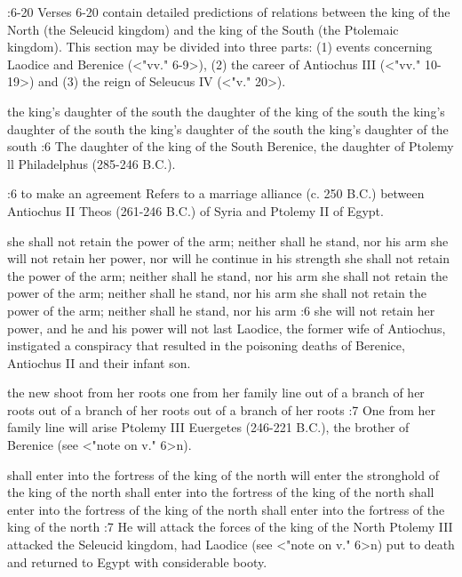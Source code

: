 :6-20 {}  Verses 6-20 contain detailed predictions of relations between the king of the North (the Seleucid kingdom) and the king 
of the South (the Ptolemaic kingdom). This section may be divided into three parts: (1) events concerning Laodice and Berenice (<"vv." 6-9>), (2) the career of Antiochus III (<"vv." 10-19>) and (3) the reign of Seleucus IV (<"v." 20>).

    {the king's daughter of the south} %
    {the daughter of the king of the south} %
    {the king's daughter of the south} %
    {the king's daughter of the south} %
    {the king's daughter of the south} %
:6 {The daughter of the king of the South} Berenice, the  
daughter of Ptolemy ll Philadelphus (285-246 B.C.).

:6 {to make an agreement}
Refers to a marriage alliance (c. 250 B.C.) between Antiochus II Theos (261-246 B.C.) of Syria and Ptolemy II of Egypt.

    {she shall not retain the power of the arm; neither shall he stand, nor his arm} %
    {she will not retain her power, nor will he continue in his strength} %
    {she shall not retain the power of the arm; neither shall he stand, nor his arm} %
    {she shall not retain the power of the arm; neither shall he stand, nor his arm} %
    {she shall not retain the power of the arm; neither shall he stand, nor his arm} %
:6 {she  will not retain her power, and he and his power will not last} 
Laodice, the former wife of Antiochus, instigated a conspiracy that resulted in the poisoning deaths of Berenice, Antiochus II and their infant son.

    {the new shoot from her roots} %
    {one from her family line} %
    {out of a branch of her roots} %
    {out of a branch of her roots} %
    {out of a branch of her roots} %
:7 {One from her family line will arise} Ptolemy III Euergetes (246-221 B.C.), the brother of Berenice (see <"note on v." 6>n).

    {shall enter into the fortress of the king of the north} %
    {will enter the stronghold of the king of the north} %
    {shall enter into the fortress of the king of the north} %
    {shall enter into the fortress of the king of the north} %
    {shall enter into the fortress of the king of the north} %
:7 {He will attack the forces of the king of the North} Ptolemy III attacked the Seleucid kingdom, had Laodice (see <"note on v." 6>n) put to death 
and returned to Egypt with considerable booty.

